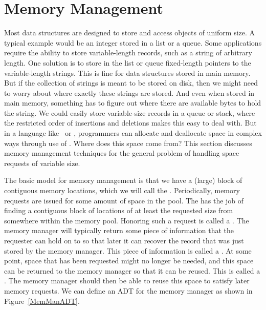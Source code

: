 
\section{Memory Management}
\label{MemMan}

Most data structures are designed to store and access objects of
uniform size.
A typical example would be an integer stored in a list or a queue.
Some applications require the ability to store variable-length records,
such as a string of arbitrary length.
One solution is to store in the list or queue fixed-length pointers to
the variable-length strings.
This is fine for data structures stored in main memory.
But if the collection of strings is meant to be stored on disk, then
we might need to worry about where exactly these strings are stored.
And even when stored in main memory, something has to figure out where
there are available bytes to hold the string.
We could easily store variable-size records in a queue or stack, where
the restricted order of insertions and deletions makes this easy to
deal with.
But in a language like \LangCPP\ or \LangJava, programmers can
allocate and deallocate space in complex ways through use of
.
Where does this space come from?
This section discusses memory management techniques for the general
problem of handling space requests of variable size.

The basic model for memory management is that we have a (large)
block of contiguous memory locations, which we will call the
.
Periodically, memory requests are issued for some amount of space in
the pool.
The  has the job of finding a contiguous block
of locations of at least the requested size from somewhere within the
memory pool.
Honoring such a request is called a
.
The memory manager will typically return some piece of information
that the requester can hold on to so that later it can recover the
record that was just stored by the memory manager.
This piece of information is called a .
At some point, space that has been requested might no longer be needed,
and this space can be returned to the memory manager so that it can be
reused.
This is called a .
The memory manager should then be able to reuse this space to satisfy
later memory requests.
We can define an ADT
for the memory manager as shown in Figure~\ref{MemManADT}.

